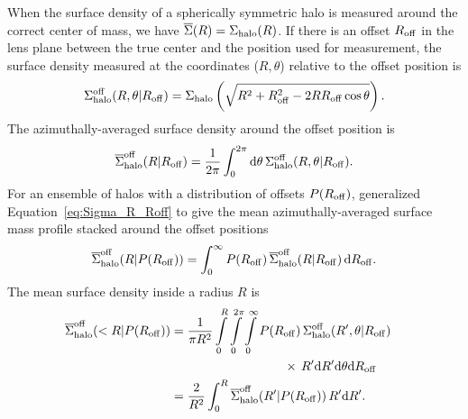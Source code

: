 \documentclass[12pt]{emulateapj}
\begin{document}
When the surface density of a spherically symmetric halo is measured
around the correct center of mass, we have
$\overline{\Sigma}(R)=\Sigma_{\rm halo}(R)$. If there is an offset
$R_{\rm off}$ in the lens plane between the true center and the
position used for measurement, the surface density measured at the
coordinates ($R, \theta$) relative to the offset position is
\citep[][Appendix B]{Yang2003}
\begin{equation}
\Sigma_{\rm halo}^{\rm off}(R,\theta|R_{\rm off})=\Sigma_{\rm halo}\left(\sqrt{R^2+R_{\rm off}^2-2RR_{\rm off}\cos\theta}\right).
\end{equation}
The azimuthally-averaged surface density around the offset position is
\begin{equation}
\overline{\Sigma}_{\rm halo}^{\rm off}(R|R_{\rm off})=\frac{1}{2\pi} \int_0^{2\pi}\mathrm{d}\theta\,
\Sigma_{\rm halo}^{\rm off}(R,\theta|R_{\rm off}).
\label{eq:Sigma_R_Roff}
\end{equation}
For an ensemble of halos with a distribution of offsets 
$P(R_{\rm off})$, \citet{Johnston2007a, Johnston2007b} generalized
Equation~\eqref{eq:Sigma_R_Roff} to give the mean azimuthally-averaged
surface mass profile stacked around the offset positions
\begin{equation}
\overline{\Sigma}_{\rm halo}^{\rm off}(R|P(R_{\rm off}))=\int_0^{\infty} 
P(R_{\rm off})\,\overline{\Sigma}_{\rm halo}^{\rm off}(R|R_{\rm
  off})\,\mathrm{d}R_{\rm off}.
\end{equation}
The mean surface density inside a radius $R$ is
\begin{align}
\overline{\Sigma}_{\rm halo}^{\rm off}(<R|P(R_{\rm off})) &=
\frac{1}{\pi R^2}
\int\limits_0^R\int\limits_0^{2\pi}\int\limits_0^{\infty} P(R_{\rm off})\,\Sigma_{\rm halo}^{\rm off}(R',\theta|R_{\rm off})\nonumber\\
& \qquad \qquad \qquad \qquad \quad \times \,R'\mathrm{d}R'\mathrm{d}\theta\mathrm{d}R_{\rm off} \nonumber\\
&= \frac{2}{R^2} \int_0^R \overline{\Sigma}_{\rm halo}^{\rm off}(R'|P(R_{\rm off}))\,R'\mathrm{d}R'.&
\end{align}
\end{document}
